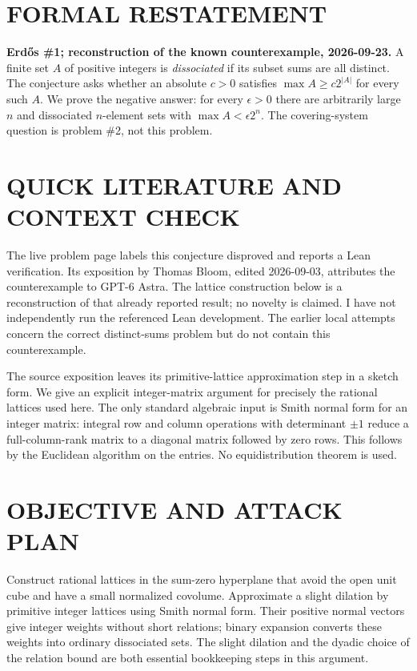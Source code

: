 \section{FORMAL RESTATEMENT}
\textbf{Erd\H{o}s \#1; reconstruction of the known counterexample, 2026-09-23.}
A finite set $A$ of positive integers is \emph{dissociated} if its subset
sums are all distinct. The conjecture asks whether an absolute $c>0$
satisfies $\max A\geq c2^{|A|}$ for every such $A$. We prove the negative
answer: for every $\epsilon>0$ there are arbitrarily large $n$ and
dissociated $n$-element sets with $\max A<\epsilon2^n$.
The covering-system question is problem \#2, not this problem.

\section{QUICK LITERATURE AND CONTEXT CHECK}
The live problem page labels this conjecture disproved and reports a Lean
verification. Its exposition by Thomas Bloom, edited 2026-09-03, attributes
the counterexample to GPT-6 Astra. The lattice construction below is a
reconstruction of that already reported result; no novelty is claimed.
I have not independently run the referenced Lean development.
The earlier local attempts concern the correct distinct-sums problem but
do not contain this counterexample.

The source exposition leaves its primitive-lattice approximation step in
a sketch form. We give an explicit integer-matrix argument for precisely
the rational lattices used here. The only standard algebraic input is
Smith normal form for an integer matrix: integral row and column
operations with determinant $\pm1$ reduce a full-column-rank matrix to
a diagonal matrix followed by zero rows. This follows by the Euclidean
algorithm on the entries. No equidistribution theorem is used.

\section{OBJECTIVE AND ATTACK PLAN}
Construct rational lattices in the sum-zero hyperplane that avoid the
open unit cube and have a small normalized covolume. Approximate a slight
dilation by primitive integer lattices using Smith normal form. Their
positive normal vectors give integer weights without short relations;
binary expansion converts these weights into ordinary dissociated sets.
The slight dilation and the dyadic choice of the relation bound are both
essential bookkeeping steps in this argument.

